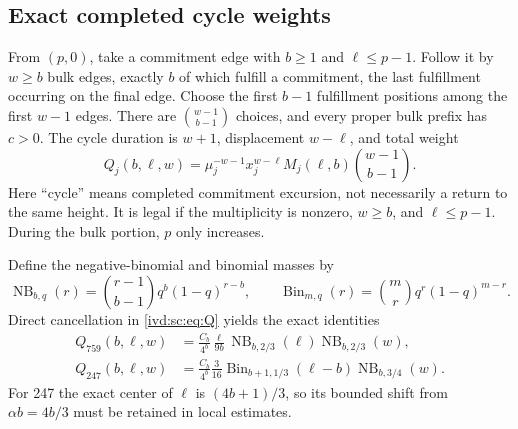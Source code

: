 \documentclass[11pt,letterpaper]{article}
\theoremstyle{remark}\newtheorem{remark}[theorem]{Remark}
\numberwithin{equation}{section}
\DeclareMathOperator{\NB}{NB}\DeclareMathOperator{\Bin}{Bin}
\begin{document}
\subsection{Exact completed cycle weights}
From $(p,0)$, take a commitment edge with $b\ge1$ and $\ell\le p-1$.
Follow it by $w\ge b$ bulk edges, exactly $b$ of which fulfill a
commitment, the last fulfillment occurring on the final edge. Choose the
first $b-1$ fulfillment positions among the first $w-1$ edges. There
are $\binom{w-1}{b-1}$ choices, and every proper bulk prefix has $c>0$.
The cycle duration is $w+1$, displacement $w-\ell$, and total weight
\begin{equation}\label{ivd:sc:eq:Q}
 Q_j(b,\ell,w)=\mu_j^{-w-1}x_j^{w-\ell}
 M_j(\ell,b)\binom{w-1}{b-1}.
\end{equation}
Here ``cycle'' means completed commitment excursion, not necessarily a
return to the same height. It is legal if the multiplicity is nonzero,
$w\ge b$, and $\ell\le p-1$. During the bulk portion, $p$ only increases.

Define the negative-binomial and binomial masses by
\[
 \NB_{b,q}(r)=\binom{r-1}{b-1}q^b(1-q)^{r-b},\qquad
 \Bin_{m,q}(r)=\binom mr q^r(1-q)^{m-r}.
\]
Direct cancellation in \eqref{ivd:sc:eq:Q} yields the exact identities
\begin{align}
 Q_{759}(b,\ell,w)&=\frac{C_b}{4^b}\frac{\ell}{9b}
  \NB_{b,2/3}(\ell)\NB_{b,2/3}(w),\label{ivd:sc:eq:factor759}\\
 Q_{247}(b,\ell,w)&=\frac{C_b}{4^b}\frac3{16}
  \Bin_{b+1,1/3}(\ell-b)\NB_{b,3/4}(w).\label{ivd:sc:eq:factor247}
\end{align}
For 247 the exact center of $\ell$ is $(4b+1)/3$, so its bounded
shift from $\alpha b=4b/3$ must be retained in local estimates.
\end{document}
